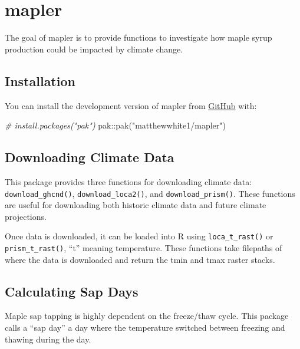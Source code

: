\documentclass[
]{article}
\author{}
\date{}
\makeatletter
\newenvironment{Shaded}{}{}
\newcommand{\CommentTok}[1]{\textcolor[rgb]{0.38,0.63,0.69}{\textit{#1}}}
\newcommand{\FunctionTok}[1]{\textcolor[rgb]{0.02,0.16,0.49}{#1}}
\newcommand{\NormalTok}[1]{#1}
\newcommand{\SpecialCharTok}[1]{\textcolor[rgb]{0.25,0.44,0.63}{#1}}
\newcommand{\StringTok}[1]{\textcolor[rgb]{0.25,0.44,0.63}{#1}}
\newcommand*\pandocbounded[1]{%
  \sbox\pandoc@box{#1}%
  \Gscale@div\@tempa{\textheight}{\dimexpr\ht\pandoc@box+\dp\pandoc@box\relax}%
  \Gscale@div\@tempb{\linewidth}{\wd\pandoc@box}%
  \ifdim\@tempb\p@<\@tempa\p@\let\@tempa\@tempb\fi%
  \ifdim\@tempa\p@<\p@\scalebox{\@tempa}{\usebox\pandoc@box}%
  \else\usebox{\pandoc@box}%
  \fi%
}
\makeatother
\begin{document}
\section{mapler}\label{mapler}

\href{https://github.com/matthewwhite1/mapler/actions/workflows/R-CMD-check.yaml}{\pandocbounded{}}

The goal of mapler is to provide functions to investigate how maple
syrup production could be impacted by climate change.

\subsection{Installation}\label{installation}

You can install the development version of mapler from
\href{https://github.com/}{GitHub} with:

\begin{Shaded}
\begin{Highlighting}[]
\CommentTok{\# install.packages("pak")}
\NormalTok{pak}\SpecialCharTok{::}\FunctionTok{pak}\NormalTok{(}\StringTok{"matthewwhite1/mapler"}\NormalTok{)}
\end{Highlighting}
\end{Shaded}

\subsection{Downloading Climate Data}\label{downloading-climate-data}

This package provides three functions for downloading climate data:
\texttt{download\_ghcnd()}, \texttt{download\_loca2()}, and
\texttt{download\_prism()}. These functions are useful for downloading
both historic climate data and future climate projections.

Once data is downloaded, it can be loaded into R using
\texttt{loca\_t\_rast()} or \texttt{prism\_t\_rast()}, ``t'' meaning
temperature. These functions take filepaths of where the data is
downloaded and return the tmin and tmax raster stacks.

\subsection{Calculating Sap Days}\label{calculating-sap-days}

Maple sap tapping is highly dependent on the freeze/thaw cycle. This
package calls a ``sap day'' a day where the temperature switched between
freezing and thawing during the day.
\end{document}
